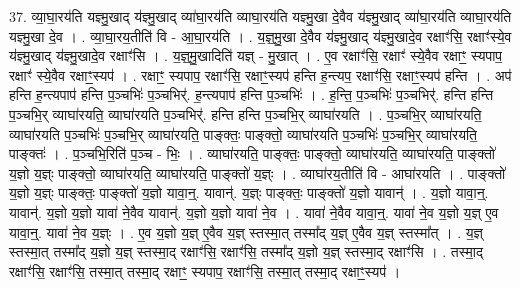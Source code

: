 \documentclass[17pt]{extarticle}
\begin{document}
37. व्या॒घा॒रय॑ति यज्ञ्मु॒खाद् य॑ज्ञ्मु॒खाद् व्या॑घा॒रय॑ति व्याघा॒रय॑ति यज्ञ्मु॒खा दे॒वैव य॑ज्ञ्मु॒खाद् व्या॑घा॒रय॑ति व्याघा॒रय॑ति यज्ञ्मु॒खा दे॒व । . व्या॒घा॒रय॒तीति॑ वि - आ॒घा॒रय॑ति । . य॒ज्ञ्॒मु॒खा दे॒वैव य॑ज्ञ्मु॒खाद् य॑ज्ञ्मु॒खादे॒व रक्षाꣳ॑सि॒ रक्षाꣳ॑स्ये॒व य॑ज्ञ्मु॒खाद् य॑ज्ञ्मु॒खादे॒व रक्षाꣳ॑सि । . य॒ज्ञ्॒मु॒खादिति॑ यज्ञ् - मु॒खात् । . ए॒व रक्षाꣳ॑सि॒ रक्षाꣳ॑ स्ये॒वैव रक्षाꣳ॒॒ स्यपाप॒ रक्षाꣳ॑ स्ये॒वैव रक्षाꣳ॒॒स्यप॑ । . रक्षाꣳ॒॒ स्यपाप॒ रक्षाꣳ॑सि॒ रक्षाꣳ॒॒स्यप॑ हन्ति ह॒न्त्यप॒ रक्षाꣳ॑सि॒ रक्षाꣳ॒॒स्यप॑ हन्ति । . अप॑ हन्ति ह॒न्त्यपाप॑ हन्ति प॒ञ्चभिः॑ प॒ञ्चभिर्॑. ह॒न्त्यपाप॑ हन्ति प॒ञ्चभिः॑ । . ह॒न्ति॒ प॒ञ्चभिः॑ प॒ञ्चभिर्॑. हन्ति हन्ति प॒ञ्चभि॒र् व्याघा॑रयति॒ व्याघा॑रयति प॒ञ्चभिर्॑. हन्ति हन्ति प॒ञ्चभि॒र् व्याघा॑रयति । . प॒ञ्चभि॒र् व्याघा॑रयति॒ व्याघा॑रयति प॒ञ्चभिः॑ प॒ञ्चभि॒र् व्याघा॑रयति॒ पाङ्क्तः॒ पाङ्क्तो॒ व्याघा॑रयति प॒ञ्चभिः॑ प॒ञ्चभि॒र् व्याघा॑रयति॒ पाङ्क्तः॑ । . प॒ञ्चभि॒रिति॑ प॒ञ्च - भिः॒ । . व्याघा॑रयति॒ पाङ्क्तः॒ पाङ्क्तो॒ व्याघा॑रयति॒ व्याघा॑रयति॒ पाङ्क्तो॑ य॒ज्ञो य॒ज्ञ्ः पाङ्क्तो॒ व्याघा॑रयति॒ व्याघा॑रयति॒ पाङ्क्तो॑ य॒ज्ञ्ः । . व्याघा॑रय॒तीति॑ वि - आघा॑रयति । . पाङ्क्तो॑ य॒ज्ञो य॒ज्ञ्ः पाङ्क्तः॒ पाङ्क्तो॑ य॒ज्ञो यावा॒न्॒. यावान्॑. य॒ज्ञ्ः पाङ्क्तः॒ पाङ्क्तो॑ य॒ज्ञो यावान्॑ । . य॒ज्ञो यावा॒न्॒. यावान्॑. य॒ज्ञो य॒ज्ञो यावा॑ ने॒वैव यावान्॑. य॒ज्ञो य॒ज्ञो यावा॑ ने॒व । . यावा॑ ने॒वैव यावा॒न्॒. यावा॑ ने॒व य॒ज्ञो य॒ज्ञ् ए॒व यावा॒न्॒. यावा॑ ने॒व य॒ज्ञ्ः । . ए॒व य॒ज्ञो य॒ज्ञ् ए॒वैव य॒ज्ञ् स्तस्मा॒त् तस्मा᳚द् य॒ज्ञ् ए॒वैव य॒ज्ञ् स्तस्मा᳚त् । . य॒ज्ञ् स्तस्मा॒त् तस्मा᳚द् य॒ज्ञो य॒ज्ञ् स्तस्मा॒द् रक्षाꣳ॑सि॒ रक्षाꣳ॑सि॒ तस्मा᳚द् य॒ज्ञो य॒ज्ञ् स्तस्मा॒द् रक्षाꣳ॑सि । . तस्मा॒द् रक्षाꣳ॑सि॒ रक्षाꣳ॑सि॒ तस्मा॒त् तस्मा॒द् रक्षाꣳ॒॒ स्यपाप॒ रक्षाꣳ॑सि॒ तस्मा॒त् तस्मा॒द् रक्षाꣳ॒॒स्यप॑ । \newline
\end{document}
